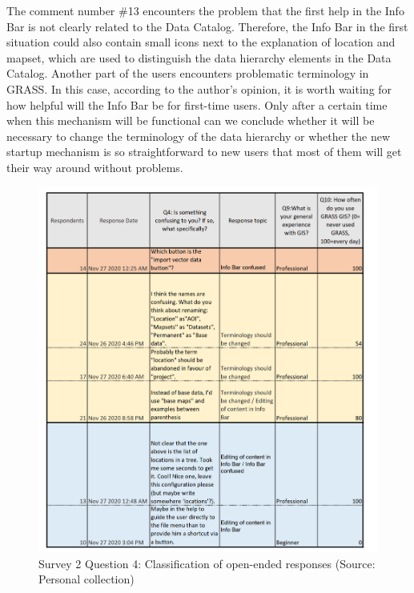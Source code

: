 \documentclass[a4paper,10pt,twoside]{article}
\begin{document}
\noindent The comment number \#13 encounters the problem that the first help in the Info Bar is not clearly related to the Data Catalog. Therefore, the Info Bar in the first situation could also contain small icons next to the explanation of location and mapset, which are used to distinguish the data hierarchy elements in the Data Catalog. Another part of the users encounters problematic terminology in GRASS. In this case, according to the author's opinion, it is worth waiting for how helpful will the Info Bar be for first-time users. Only after a certain time when this mechanism will be functional can we conclude whether it will be necessary to change the terminology of the data hierarchy or whether the new startup mechanism is so straightforward to new users that most of them will get their way around without problems.

\vspace{0.3cm}
\begin{figure}[hbt!] 
\begin{center}
\includegraphics[width=16.5cm]{../surveys/analyzed_data/survey2_question4.png} 
\caption[Survey 2 Question 4: Classification of open-ended responses]{Survey 2 Question 4: Classification of open-ended responses (Source: Personal collection)}
\label{fig:survey2_question4}
\end{center}
\end{figure}
\end{document}
